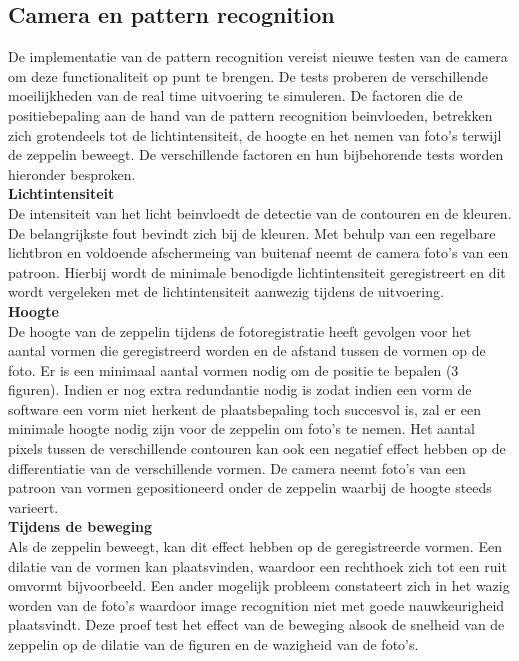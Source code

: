\documentclass[tt]{penoverslag}
\begin{document}
\subsection{Camera en pattern recognition}
De implementatie van de pattern recognition vereist nieuwe testen van de camera om deze functionaliteit op punt te brengen. De tests proberen de verschillende moeilijkheden van de real time uitvoering te simuleren. De factoren die de positiebepaling aan de hand van de pattern recognition beinvloeden, betrekken zich grotendeels tot de lichtintensiteit, de hoogte en het nemen van foto’s terwijl de zeppelin beweegt. De verschillende factoren en hun bijbehorende tests worden hieronder besproken.\\
\textbf{Lichtintensiteit}\\
De intensiteit van het licht beinvloedt de detectie van de contouren en de kleuren. De belangrijkste fout bevindt zich bij de kleuren. Met behulp van een regelbare lichtbron en voldoende afschermeing van buitenaf neemt de camera foto’s van een patroon. Hierbij wordt de minimale benodigde lichtintensiteit geregistreert en dit wordt vergeleken met de lichtintensiteit aanwezig tijdens de uitvoering. \\
\textbf{Hoogte}\\
De hoogte van de zeppelin tijdens de fotoregistratie heeft gevolgen voor het aantal vormen die geregistreerd worden en de afstand tussen de vormen op de foto. Er is een minimaal aantal vormen nodig om de positie te bepalen (3 figuren). Indien er nog extra redundantie nodig is zodat indien een vorm de software een vorm niet herkent de plaatsbepaling toch succesvol is, zal er een minimale hoogte nodig zijn voor de zeppelin om foto’s te nemen. Het aantal pixels tussen de verschillende contouren kan ook een negatief effect hebben op de differentiatie van de verschillende vormen. De camera neemt foto’s van een patroon van vormen gepositioneerd onder de zeppelin waarbij de hoogte steeds varieert.\\ 
\textbf{Tijdens de beweging}\\
Als de zeppelin beweegt, kan dit effect hebben op de geregistreerde vormen. Een dilatie van de vormen kan plaatsvinden, waardoor een rechthoek zich tot een ruit omvormt bijvoorbeeld. Een ander mogelijk probleem constateert zich in het wazig worden van de foto’s waardoor image recognition niet met goede nauwkeurigheid plaatsvindt. Deze proef test het effect van de beweging  alsook de snelheid van de zeppelin op de dilatie van de figuren en de wazigheid van de foto’s.  \\
\end{document}
